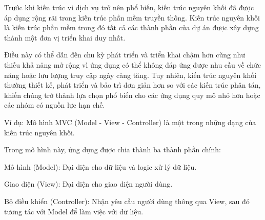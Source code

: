 Trước khi kiến trúc vi dịch vụ trở nên phổ biến, kiến trúc nguyên khối đã được áp dụng rộng rãi trong kiến trúc phần mềm truyền thống. Kiến trúc nguyên khối là kiến trúc phần mềm trong đó  tất cả các thành phần      của  dự án    được xây dựng thành một đơn vị triển khai    duy nhất. 





Điều này có thể dẫn đến chu kỳ phát triển và triển khai chậm hơn cũng như thiếu khả năng mở rộng vì ứng dụng có thể không đáp ứng được nhu cầu về chức năng hoặc lưu lượng truy cập ngày càng tăng. Tuy nhiên, kiến trúc nguyên khối thường thiết kế, phát triển và bảo trì đơn giản hơn so với các kiến trúc phân tán, khiến chúng trở thành lựa chọn phổ biến cho các ứng dụng quy mô nhỏ hơn hoặc các nhóm có nguồn lực hạn chế.


% 
Ví dụ: Mô hình MVC (Model - View - Controller) là một trong những dạng của kiến trúc nguyên khối.

Trong mô hình này, ứng dụng được chia thành ba thành phần chính:

Mô hình (Model): Đại diện cho dữ liệu và logic xử lý dữ liệu.

Giao diện (View): Đại diện cho giao diện người dùng.

Bộ điều khiển (Controller): Nhận yêu cầu người dùng thông qua View, sau đó tương tác với Model để làm việc với dữ liệu.

%  
 
 
 


